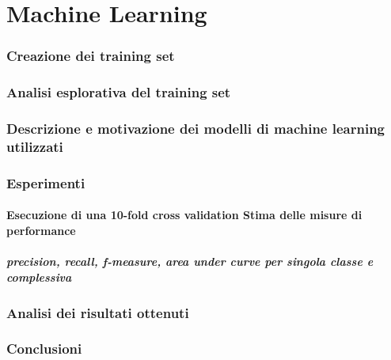 \part{Machine Learning}
\section{Creazione dei training set}
\section{Analisi esplorativa del training set}
\section{Descrizione e motivazione dei modelli di machine learning utilizzati}

\section{Esperimenti}

\subsection{Esecuzione di una 10-fold cross validation
	Stima delle misure di performance}
\subsubsection{precision, recall, f-measure, area under curve per singola classe e complessiva}

\section{Analisi dei risultati ottenuti}
\section{Conclusioni}

